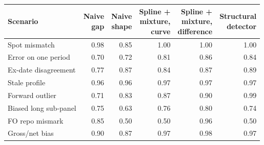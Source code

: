 {\small\begin{tabular}{lrrrrr}
\toprule
Scenario & \makecell{Naive\\gap} & \makecell{Naive\\shape} & \makecell{Spline +\\mixture,\\curve} & \makecell{Spline +\\mixture,\\difference} & \makecell{Structural\\detector} \\
\midrule
Spot mismatch & \num{0.98} & \num{0.85} & \num{1.00} & \num{1.00} & \num{1.00} \\
Error on one period & \num{0.70} & \num{0.72} & \num{0.81} & \num{0.86} & \num{0.84} \\
Ex-date disagreement & \num{0.77} & \num{0.87} & \num{0.84} & \num{0.87} & \num{0.89} \\
Stale profile & \num{0.96} & \num{0.96} & \num{0.97} & \num{0.97} & \num{0.97} \\
Forward outlier & \num{0.71} & \num{0.83} & \num{0.87} & \num{0.90} & \num{0.99} \\
Biased long sub-panel & \num{0.75} & \num{0.63} & \num{0.76} & \num{0.80} & \num{0.74} \\
FO repo mismark & \num{0.85} & \num{0.50} & \num{0.50} & \num{0.96} & \num{0.50} \\
Gross/net bias & \num{0.90} & \num{0.87} & \num{0.97} & \num{0.98} & \num{0.97} \\
\bottomrule
\end{tabular}}
